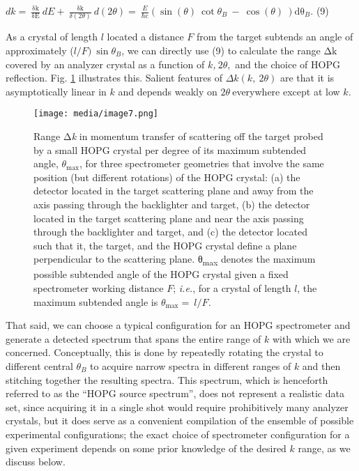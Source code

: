 \(dk = \ \frac{\text{δk}}{\text{δE}}\ dE + \ \frac{\text{δk}}{\delta(2\theta)}\ d(2\theta) = \ \frac{E}{\text{ℏc}}\left( \sin{(\theta)\ \cot{\theta_{B}\  - \ \cos{(\theta)}}}\  \right)\text{dθ}_{B}\).
(9)

As a crystal of length \(l\) located a distance \(F\) from the target
subtends an angle of approximately (\(l/F)\ \sin\theta_{B}\), we can
directly use (9) to calculate the range \(\text{Δk}\) covered by an
analyzer crystal as a function of \(k\)\emph{,}\(\ 2\theta,\) and the
choice of HOPG reflection. Fig. \ref{edimage7} illustrates this. Salient features of
\(\Delta k(k,\ 2\theta)\) are that it is asymptotically linear in \(k\)
and depends weakly on \(2\theta\ \)everywhere except at low
\(k\)\emph{.}

\begin{figure}[h] 
\caption{ Range Δ\emph{k} in momentum transfer of scattering off the
target probed by a small HOPG crystal per degree of its maximum
subtended angle, \(\theta_{\max}\), for three spectrometer geometries
that involve the same position (but different rotations) of the HOPG
crystal: (a) the detector located in the target scattering plane and
away from the axis passing through the backlighter and target, (b) the
detector located in the target scattering plane and near the axis
passing through the backlighter and target, and (c) the detector located
such that it, the target, and the HOPG crystal define a plane
perpendicular to the scattering plane. θ\textsubscript{max} denotes the
maximum possible subtended angle of the HOPG crystal given a fixed
spectrometer working distance \(F\); \emph{i.e.}, for a crystal of
length \(l\), the maximum subtended angle is
\(\theta_{\max} = \ l/F\)\emph{.}}
\label{edimage7}
\centering
\texttt{[image: media/image7.png]}
\end{figure}

That said, we can choose a typical configuration for an HOPG
spectrometer and generate a detected spectrum that spans the entire
range of \(k\) with which we are concerned. Conceptually, this is done
by repeatedly rotating the crystal to different central \(\theta_{B}\)
to acquire narrow spectra in different ranges of \(k\) and then
stitching together the resulting spectra. This spectrum, which is
henceforth referred to as the ``HOPG source spectrum'', does not
represent a realistic data set, since acquiring it in a single shot
would require prohibitively many analyzer crystals, but it does serve as
a convenient compilation of the ensemble of possible experimental
configurations; the exact choice of spectrometer configuration for a
given experiment depends on some prior knowledge of the desired \(k\)
range, as we discuss below.

